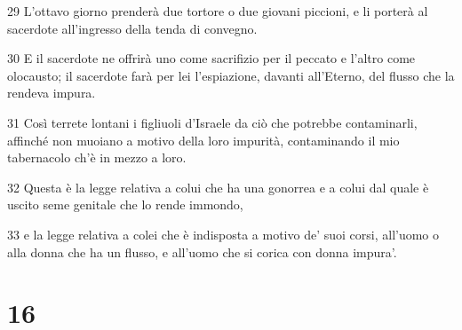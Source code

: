 \par 29 L'ottavo giorno prenderà due tortore o due giovani piccioni, e li porterà al sacerdote all'ingresso della tenda di convegno.
\par 30 E il sacerdote ne offrirà uno come sacrifizio per il peccato e l'altro come olocausto; il sacerdote farà per lei l'espiazione, davanti all'Eterno, del flusso che la rendeva impura.
\par 31 Così terrete lontani i figliuoli d'Israele da ciò che potrebbe contaminarli, affinché non muoiano a motivo della loro impurità, contaminando il mio tabernacolo ch'è in mezzo a loro.
\par 32 Questa è la legge relativa a colui che ha una gonorrea e a colui dal quale è uscito seme genitale che lo rende immondo,
\par 33 e la legge relativa a colei che è indisposta a motivo de' suoi corsi, all'uomo o alla donna che ha un flusso, e all'uomo che si corica con donna impura'.

\chapter{16}

